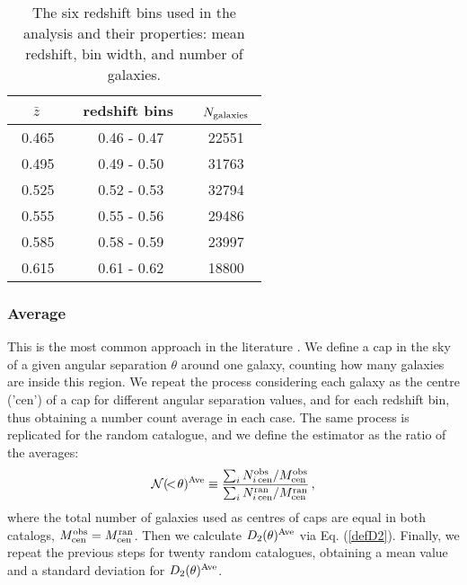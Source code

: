 \documentclass[useAMS,usenatbib]{mn2e}
\begin{document}
 
\begin{table}
\centering
\begin{tabular}{|c|c|c|}
\hline
\,\,$\bar{z}$ \,\,& \,\,redshift bins \,\,& \,\,$N_{\rm galaxies}$\,\, \\
\hline
\,\,\,0.465 \,\,& 0.46 - 0.47 & 22551 \\
\,\,\,0.495 \,\,& 0.49 - 0.50 & 31763 \\
\,\,\,0.525 \,\,& 0.52 - 0.53 & 32794 \\
\,\,\,0.555 \,\,& 0.55 - 0.56 & 29486 \\
\,\,\,0.585 \,\,& 0.58 - 0.59 & 23997 \\
\,\,\,0.615 \,\,& 0.61 - 0.62 & 18800 \\
\hline
\end{tabular}
\caption{The six redshift bins used in the analysis and their properties: mean redshift, 
bin width, and number of galaxies.}
\label{table1}
\end{table}



\subsubsection{Average}

This is the most common approach in the literature \citep{alonso14,ntelis17}. We define a cap in the sky of a given angular separation $\theta$ around one galaxy, counting how many galaxies are  inside this region. We repeat the process considering each galaxy as the centre ('cen') of a cap for different angular separation values, and for each redshift bin, thus obtaining a number count average in each case. The same process is replicated for the random catalogue, and  we define the estimator as the ratio of the averages:
\begin{equation}
\label{NMean}
{\cal N}(\!<\!\theta)^{\rm Ave} \equiv \frac{  \sum_i N^{\rm obs}_{i\,{\rm cen}}/{M^{\rm obs}_{\rm cen}}}{ 
\sum_i N^{\rm ran}_{i\,{\rm cen}} /{M^{\rm ran}_{\rm cen}}} \, ,
\end{equation}
where the total number of galaxies used as centres of caps are equal in both  catalogs, $M^{\rm obs}_{\rm cen} = M^{\rm ran}_{\rm cen}$. Then we calculate $D_2(\theta)^{\rm Ave}$ via Eq. (\ref{defD2}). Finally, we repeat the previous steps for twenty random catalogues, obtaining a mean value and a standard deviation for $D_2(\theta)^{\rm Ave}$.\\
\end{document}

